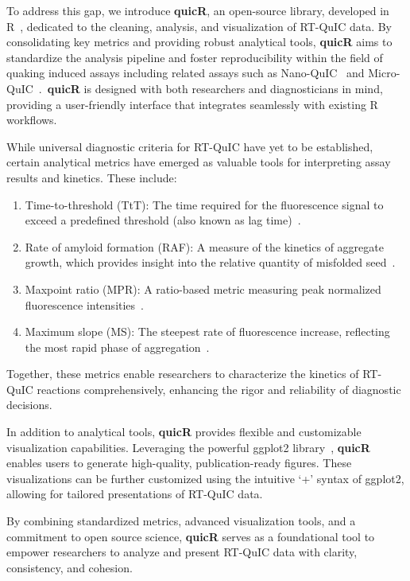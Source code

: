 \documentclass[preprint,12pt,a4paper]{elsarticle}
\begin{document}
        To address this gap, we introduce \textbf{quicR}, an open-source library, developed in R~\cite{R2024}, dedicated to the cleaning, analysis, and visualization of RT-QuIC data. By consolidating key metrics and providing robust analytical tools, \textbf{quicR} aims to standardize the analysis pipeline and foster reproducibility within the field of quaking induced assays including related assays such as Nano-QuIC~\cite{Christenson2023} and Micro-QuIC~\cite{Lee2024}.\ \textbf{quicR} is designed with both researchers and diagnosticians in mind, providing a user-friendly interface that integrates seamlessly with existing R workflows.

        While universal diagnostic criteria for RT-QuIC have yet to be established, certain analytical metrics have emerged as valuable tools for interpreting assay results and kinetics. These include:

        \begin{enumerate}
            \item Time-to-threshold (TtT): The time required for the fluorescence signal to exceed a predefined threshold (also known as lag time)~\cite{Orru2015}. 
            \item Rate of amyloid formation (RAF): A measure of the kinetics of aggregate growth, which provides insight into the relative quantity of misfolded seed~\cite{Gallups2022}.
            \item Maxpoint ratio (MPR): A ratio-based metric measuring peak normalized fluorescence intensities~\cite{Rowden2023}.
            \item Maximum slope (MS): The steepest rate of fluorescence increase, reflecting the most rapid phase of aggregation~\cite{Henderson2015}.
        \end{enumerate}

        Together, these metrics enable researchers to characterize the kinetics of RT-QuIC reactions comprehensively, enhancing the rigor and reliability of diagnostic decisions.

        In addition to analytical tools, \textbf{quicR} provides flexible and customizable visualization capabilities. Leveraging the powerful ggplot2 library~\cite{ggplot2016}, \textbf{quicR} enables users to generate high-quality, publication-ready figures. These visualizations can be further customized using the intuitive `+' syntax of ggplot2, allowing for tailored presentations of RT-QuIC data.

        By combining standardized metrics, advanced visualization tools, and a commitment to open source science, \textbf{quicR} serves as a foundational tool to empower researchers to analyze and present RT-QuIC data with clarity, consistency, and cohesion.
\end{document}
